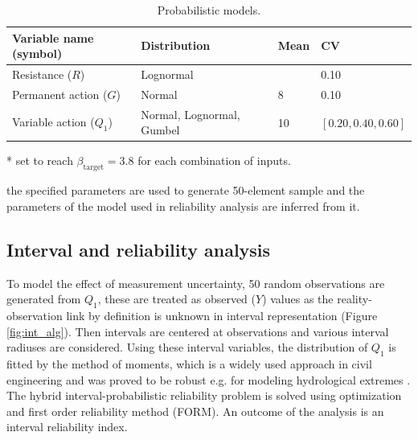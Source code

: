 \begin{table}[htbp!]
\caption{Probabilistic models.}
\centering
\label{tab:prob_models_mu}
\small
	\begin{threeparttable}
    \begin{tabular}{llll}
    \toprule
    Variable name (symbol)  & Distribution & Mean & CV \\
    \midrule
    \rowcolor{lightgrey} Resistance ($R$)  & Lognormal & \tnote{*} & 0.10  \\
    Permanent action ($G$) & Normal &  8  & 0.10 \\
    \rowcolor{lightgrey} Variable action ($Q_1$)\tnote{\textdagger}  & Normal, Lognormal, Gumbel & 10 & $[0.20, 0.40, 0.60]$ \\
    \bottomrule
    \end{tabular}
    \begin{tablenotes}
    	\item[*] set to reach $\beta_\mathrm{target} = 3.8$ for each combination of inputs.
	    \item[\textdagger] the specified parameters are used to generate 50-element sample and the parameters of the model used in reliability analysis are inferred from it.  
   	\end{tablenotes}
   	\end{threeparttable}
\end{table}

\subsection{Interval and reliability analysis}
\label{subsec:interval_reli}
To model the effect of measurement uncertainty, 50 random observations are generated from $Q_1$, these are treated as observed ($Y$) values as the reality-observation link by definition is unknown in interval representation (Figure \ref{fig:int_alg}). Then intervals are centered at observations and various interval radiuses are considered. Using these interval variables, the distribution of $Q_1$ is fitted by the method of moments, which is a widely used approach in civil engineering \citep{Sanpaolesi1998} and was proved to be robust e.g. for modeling hydrological extremes \citep{Madsen1997}. The hybrid interval-probabilistic reliability problem is solved using optimization and first order reliability method (FORM). An outcome of the analysis is an interval reliability index.

